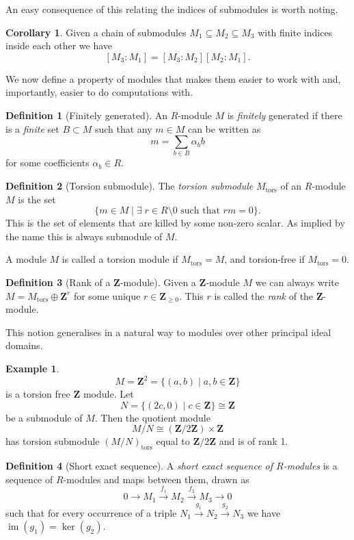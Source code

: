 \documentclass[12pt,a4paper,abstracton,bibtotoc]{scrreprt}
\theoremstyle{definition}
\newtheorem{cor}{Corollary}
\newtheorem{defn}{Definition}
\newtheorem{ex}{Example}
\newcommand{\ZZ}{\mathbf{Z}}
\DeclareMathOperator{\im}{im}
\begin{document}
An easy consequence of this relating the indices of submodules is worth noting.

\begin{cor}
\label{cor:indexmult}
Given a chain of submodules $M_1 \subseteq M_2 \subseteq M_3$ with finite indices inside each other we have
\[
[M_3:M_1] = [M_3:M_2][M_2:M_1].
\]
\end{cor}

\minisec{}
We now define a property of modules that makes them easier to work with and, importantly, easier to do computations with.

\begin{defn}[Finitely generated]
An $R$-module $M$ is \emph{finitely} generated if there is a \emph{finite} set $B\subset M$ such that any $m\in M$ can be written as
\[m = \sum_{b\in B} \alpha_b b\]
for some coefficients $\alpha_b \in R$.
\end{defn}

\begin{defn}[Torsion submodule]
The \emph{torsion submodule} $M_\text{tors}$ of an $R$-module $M$ is the set
\[
\{m\in M \mid \exists\; r \in R\setminus 0 \text{ such that } rm = 0\}.
\]
This is the set of elements that are killed by some non-zero scalar.
As implied by the name this is always submodule of $M$.
\end{defn}

A module $M$ is called a torsion module if $M_\text{tors} = M$, and torsion-free if $M_\text{tors} = 0$.

\begin{defn}[Rank of a $\ZZ$-module]
Given a $\ZZ$-module $M$ we can always write $M = M_\text{tors} \oplus \ZZ^r$ for some unique $r\in \ZZ_{\ge 0}$.
This $r$ is called the \emph{rank} of the $\ZZ$-module.
\end{defn}

This notion generalises in a natural way to modules over other principal ideal domains.

\begin{ex}
\[M = \ZZ^2 = \{(a,b)\mid a,b\in \ZZ\}\]
is a torsion free $\ZZ$ module. Let
\[N = \{(2c,0) \mid c\in\ZZ\} \cong \ZZ\]
be a submodule of $M$.
Then the quotient module
\[M/N \cong (\ZZ/2\ZZ)\times \ZZ\]
has torsion submodule $(M/N)_\text{tors}$ equal to $\ZZ/2\ZZ$ and is of rank 1.
\end{ex}

\begin{defn}[Short exact sequence]
A \emph{short exact sequence of $R$-modules} is a sequence of $R$-modules and maps between them, drawn as
\[
0 \to M_1 \xrightarrow{f_1} M_2 \xrightarrow{f_2} M_3 \to 0
\]
such that for every occurrence of a triple $N_1 \xrightarrow{g_1} N_2 \xrightarrow{g_2} N_3$ we have $\im(g_1) = \ker(g_2)$.
\end{defn}
\end{document}
